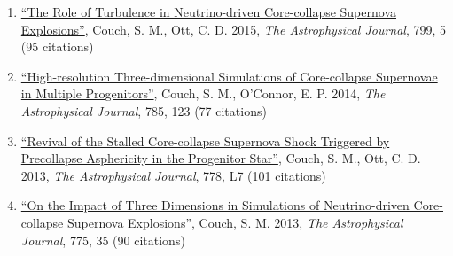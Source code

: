 \documentclass[12pt]{article}
\begin{document}
\begin{enumerate}
  \item \href{https://ui.adsabs.harvard.edu/#abs/2015ApJ...799....5C/abstract}{``The Role of Turbulence in Neutrino-driven Core-collapse Supernova Explosions''}, Couch, S. M., Ott, C. D. 2015, {\itshape The Astrophysical Journal}, 799, 5 (95 citations)

  \item \href{https://ui.adsabs.harvard.edu/#abs/2014ApJ...785..123C/abstract}{``High-resolution Three-dimensional Simulations of Core-collapse Supernovae in Multiple Progenitors''}, Couch, S. M., O'Connor, E. P. 2014, {\itshape The Astrophysical Journal}, 785, 123 (77 citations)

  \item \href{https://ui.adsabs.harvard.edu/#abs/2013ApJ...778L...7C/abstract}{``Revival of the Stalled Core-collapse Supernova Shock Triggered by Precollapse Asphericity in the Progenitor Star''}, Couch, S. M., Ott, C. D. 2013, {\itshape The Astrophysical Journal}, 778, L7 (101 citations)

  \item \href{https://ui.adsabs.harvard.edu/#abs/2013ApJ...775...35C/abstract}{``On the Impact of Three Dimensions in Simulations of Neutrino-driven Core-collapse Supernova Explosions''}, Couch, S. M. 2013, {\itshape The Astrophysical Journal}, 775, 35 (90 citations)

\end{enumerate}
\end{document}
